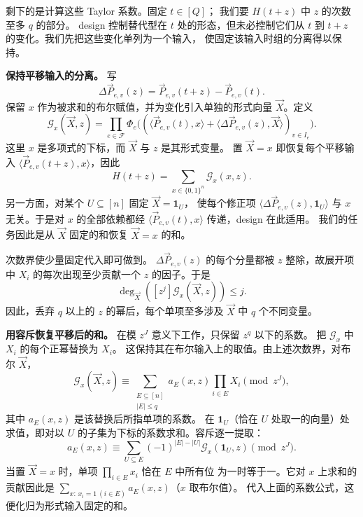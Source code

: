 \documentclass[11pt,reqno]{amsart}
\numberwithin{equation}{section}
\theoremstyle{definition}\newtheorem{definition}[theorem]{定义}
\theoremstyle{remark}\newtheorem{remark}[theorem]{注}
\renewcommand{\le}{\leqslant}
\begin{document}
剩下的是计算这些 Taylor 系数。固定 $t\in[Q]$；
我们要 $H(t+z)$ 中 $z$ 的次数至多 $q$ 的部分。
design 控制替代型在 $t$ 处的形态，但未必控制它们从 $t$
到 $t+z$ 的变化。我们先把这些变化单列为一个输入，
使固定该输入时组的分离得以保持。

\smallskip\noindent
\textbf{保持平移输入的分离。}
写
\[
 \Delta\vec P_{e,v}(z)=\vec P_{e,v}(t+z)-\vec P_{e,v}(t).
\]
保留 $x$ 作为被求和的布尔赋值，并为变化引入单独的形式向量
$\vec X$。定义
\begin{equation}\label{eq:outline-taylor-product}
 \mathcal G_x(\vec X,z)=
 \prod_{e\in\mathcal F}\Phi_e\bigl(
       (\langle\vec P_{e,v}(t),x\rangle+
        \langle\Delta\vec P_{e,v}(z),\vec X\rangle)_{v\in I_e}\bigr).
\end{equation}
这里 $x$ 是多项式的下标，而 $\vec X$ 与 $z$ 是其形式变量。
置 $\vec X=x$ 即恢复每个平移输入
$\langle\vec P_{e,v}(t+z),x\rangle$，因此
\[
 H(t+z)=\sum_{x\in\{0,1\}^n}\mathcal G_x(x,z).
\]
另一方面，对某个 $U\subseteq[n]$ 固定 $\vec X=\mathbf1_U$，
使每个修正项 $\langle\Delta\vec P_{e,v}(z),\mathbf1_U\rangle$
与 $x$ 无关。于是对 $x$ 的全部依赖都经
$\langle\vec P_{e,v}(t),x\rangle$ 传递，design 在此适用。
我们的任务因此是从 $\vec X$ 固定的和恢复 $\vec X=x$ 的和。

次数界使少量固定代入即可做到。
$\Delta\vec P_{e,v}(z)$ 的每个分量都被 $z$ 整除，故展开项中
$X_i$ 的每次出现至少贡献一个 $z$ 的因子。于是
\[
 \deg_{\vec X}([z^j]\mathcal G_x(\vec X,z))\le j.
\]
因此，丢弃 $q$ 以上的 $z$ 的幂后，每个单项至多涉及 $\vec X$
中 $q$ 个不同变量。

\smallskip\noindent
\textbf{用容斥恢复平移后的和。}
在模 $z^J$ 意义下工作，只保留 $z^q$ 以下的系数。
把 $\mathcal G_x$ 中 $X_i$ 的每个正幂替换为 $X_i$。
这保持其在布尔输入上的取值。由上述次数界，对布尔 $\vec X$，
\[
 \mathcal G_x(\vec X,z)\equiv
 \sum_{\substack{E\subseteq[n]\\|E|\le q}}
       a_E(x,z)\prod_{i\in E}X_i\pmod{z^J},
\]
其中 $a_E(x,z)$ 是该替换后所指单项的系数。
在 $\mathbf1_U$（恰在 $U$ 处取一的向量）处求值，即对以 $U$
的子集为下标的系数求和。容斥逐一提取：
\[
 a_E(x,z)\equiv
 \sum_{U\subseteq E}(-1)^{|E|-|U|}
                 \mathcal G_x(\mathbf1_U,z)\pmod{z^J}.
\]
当置 $\vec X=x$ 时，单项 $\prod_{i\in E}x_i$ 恰在 $E$ 中所有位
为一时等于一。它对 $x$ 上求和的贡献因此是
$\sum_{x:\,x_i=1\ (i\in E)}a_E(x,z)$（$x$ 取布尔值）。
代入上面的系数公式，这便化归为形式输入固定的和。
\end{document}
